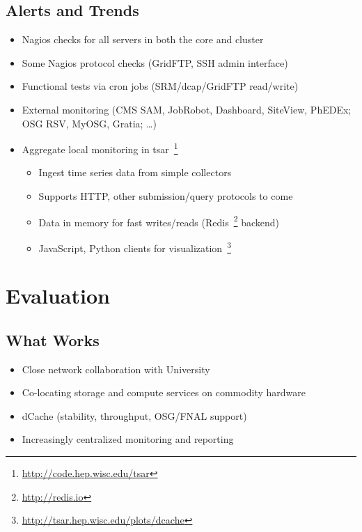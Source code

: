 \documentclass{beamer}
\begin{document}
\subsection{Alerts and Trends} %
\begin{frame}
\begin{itemize}
	\item Nagios checks for all servers in both the core and cluster
	\item Some Nagios protocol checks (GridFTP, SSH admin interface)
	\item Functional tests via cron jobs (SRM/dcap/GridFTP read/write)
	\item External monitoring (CMS SAM, JobRobot, Dashboard, SiteView, PhEDEx; OSG RSV, MyOSG, Gratia; \ldots{})
	\item Aggregate local monitoring in tsar~\footnote{\url{http://code.hep.wisc.edu/tsar}}
	\begin{itemize}
		\item Ingest time series data from simple collectors
		\item Supports HTTP, other submission/query protocols to come
		\item Data in memory for fast writes/reads (Redis~\footnote{\url{http://redis.io}} backend)
		\item JavaScript, Python clients for visualization~\footnote{\url{http://tsar.hep.wisc.edu/plots/dcache}}
	\end{itemize}
\end{itemize}
\end{frame}

\section{Evaluation}
\subsection{What Works}
\begin{frame}
\begin{itemize}
	\item Close network collaboration with University
	\item Co-locating storage and compute services on commodity hardware
	\item dCache (stability, throughput, OSG/FNAL support)
	\item Increasingly centralized monitoring and reporting
\end{itemize}
\end{frame}
\end{document}
